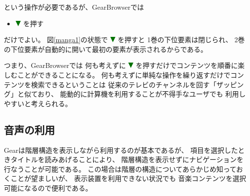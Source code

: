 \documentclass[twoside]{wiss}
\def\GEAR{\textsf{Gear}}
\def\GB{\textsf{GearBrowser}}
\def\down{ \includegraphics[width=3mm,bb=0 0 36 36]{figures/downtriangle.pdf} }
\begin{document}
\noindent
という操作が必要であるが、{\GB}では

\begin{itemize}
\item {\down}を押す
\end{itemize}

\noindent
だけでよい。
図\ref{manga1}の状態で{\down}を押すと
1巻の下位要素は閉じられ、
2巻の下位要素が自動的に開いて最初の要素が表示されるからである。

つまり、{\GB}では
何も考えずに
{\down}を押すだけでコンテンツを順番に楽しむことができることになる。
何も考えずに単純な操作を繰り返すだけでコンテンツを検索できるということは
従来のテレビのチャンネルを回す「ザッピング」と似ており、
能動的に計算機を利用することが不得手なユーザでも
利用しやすいと考えられる。


\subsection{音声の利用}

{\GEAR}は階層構造を表示しながら利用するのが基本であるが、
項目を選択したときタイトルを読みあげることにより、
階層構造を表示せずにナビゲーションを行なうことが可能である。
この場合は階層の構造についてあらかじめ知っておくことが望ましいが、
表示装置を利用できない状況でも
音楽コンテンツを選択可能になるので便利である。

% 


% 
\end{document}
